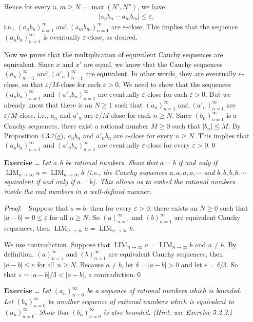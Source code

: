 \documentclass{book}
\DeclareMathOperator{\tlim}{LIM}%
\newcommand{\pff}{\vspace{.25em}\noindent\emph{Proof.}~~}
\newcounter{Exercise}[section]
\renewcommand{\theExercise}{\thesection.\arabic{Exercise}.}
\newcommand{\new}{\vspace{1.5em}\noindent\textbf{{Exercise \stepcounter{Exercise}\textbf{\theExercise}}} }
\begin{document}
Hence for every $n,m\geq N=\max(N',N'')$, we have 
    \begin{align*}
        |a_nb_n-a_mb_m|\leq\varepsilon,
    \end{align*}
i.e., $(a_nb_n)_{n=1}^\infty$ and $(a_mb_m)_{n=1}^\infty$ are $\varepsilon$-close. This implies that the sequence $(a_nb_n)_{n=1}^\infty$ is eventually $\varepsilon$-close, as desired.

Now we prove that the multiplication of equivalent Cauchy sequences are equivalent. Since $x$ and $x'$ are equal, we know that the Cauchy sequences $(a_n)_{n=1}^\infty$ and $(a'_n)_{n=1}^\infty$ are equivalent. In other words, they are eventually $\varepsilon$-close, so that $\varepsilon/M$-close for each $\varepsilon>0$. We need to show that the sequences $(a_nb_n)_{n=1}^\infty$ and $(a'_nb_n)_{n=1}^\infty$ are eventually $\varepsilon$-close for each $\varepsilon>0$. But we already know that there is an $N\geq 1$ such that $(a_n)_{n=1}^\infty$ and $(a'_n)_{n=1}^\infty$ are $\varepsilon/M$-close, i.e., $a_n$ and $a'_n$ are $\varepsilon/M$-close for each $n\geq N$. Since $(b_n)_{n=1}^\infty$ is a Cauchy sequences, there exist a rational number $M\geq 0$ such that $|b_n|\leq M$. By Proposition 4.3.7(g), $a_nb_n$ and $a'_nb_n$ are $\varepsilon$-close for every $n\geq N$. This implies that $(a_nb_n)_{n=1}^\infty$ and $(a'_nb_n)_{n=1}^\infty$ are eventually $\varepsilon$-close for every $\varepsilon>0$.\qed


\new\emph{Let $a,b$ be rational numbers. Show that $a=b$ if and only if $\tlim_{n\to\infty}a=\tlim_{n\to\infty}b$ (i.e., the Cauchy sequences $a,a,a,a,\cdots$ and $b,b,b,b,\cdots$ equivalent if and only if $a=b$). This allows us to embed the rational numbers inside the real numbers in a well-defined manner.}

\pff Suppose that $a=b$, then for every $\varepsilon>0$, there exists an $N\geq 0$ such that $|a-b|=0\leq\varepsilon$ for all $n\geq N$. So $(a)_{n=1}^\infty$ and $(b)_{n=1}^\infty$ are equivalent Cauchy sequences, then $\tlim_{n\to\infty}a=\tlim_{n\to\infty}b$.

We use contradiction. Suppose that $\tlim_{n\to\infty}a=\tlim_{n\to\infty}b$ and $a\neq b$. By definition, $(a)_{n=1}^\infty$ and $(b)_{n=1}^\infty$ are equivalent Cauchy sequences, then $|a-b|\leq\varepsilon$ for all $n\geq N$. Because $a\neq b$, let $\delta=|a-b|>0$ and let $\varepsilon=\delta/3$. So that $\varepsilon=|a-b|/3<|a-b|$, a contradiction.\qed

\new\emph{Let $(a_n)_{n=0}^\infty$ be a sequence of rational numbers which is bounded. Let $(b_n)_{n=0}^\infty$ be another sequence of rational numbers which is equivalent to $(a_n)_{n=0}^\infty$. Show that $(b_n)_{n=0}^\infty$ is also bounded. (Hint: use Exercise 5.2.2.)}
\end{document}
